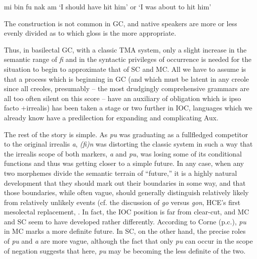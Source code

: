 \ea\label{ex:2:121}
mi bin fu nak am
\glt `I should have hit him' or `I was about to hit him'
\z

The construction is not common in GC, and native speakers are more or less evenly divided as to which gloss is the more appropriate.

Thus, in basilectal GC, with a classic TMA system, only a slight increase in the semantic range of \textit{fi} and in the syntactic privileges of occurrence is needed for the situation to begin to approximate that of SC and MC. All we have to assume is that a process which is beginning in GC (and which must be latent in any creole since all creoles, presumably -- the most drudgingly comprehensive grammars are all too often silent on this score -- have an auxiliary of obligation which is ipso facto +irrealis) has been taken a stage or two further in IOC, languages which we already know have a predilection for expanding and complicating Aux.

The rest of the story is simple. As \textit{pu} was graduating as a full\-fledged competitor to the original irrealis \textit{a}, \textit{(fi)n} was distorting the classic system in such a way that the irrealis scope of both markers, \textit{a} and \textit{pu}, was losing some of its conditional functions and thus was getting closer to a simple future. In any case, when any two mor\-phemes divide the semantic terrain of ``future,'' it is a highly natural development that they should mark out their boundaries in some way, and that those boundaries, while often vague, should generally dis\-tinguish relatively likely from relatively unlikely events (cf. the discus\-sion of \textit{go} versus \textit{gon}, HCE's first mesolectal replacement, \citet[23ff., 181ff.]{Bickerton1977}.
In fact, the IOC position is far from clear-cut, and MC and SC seem to have developed rather differently. According to Corne (p.c.), \textit{pu} in MC marks a more definite future. In SC, on the other hand, the precise roles of \textit{pu} and \textit{a} are more vague, although the fact that only \textit{pu} can occur in the scope of negation suggests that here, \textit{pu} may be becoming the less definite of the two.\\\\

